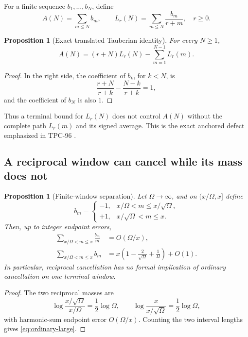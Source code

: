 \documentclass[11pt]{article}
\newtheorem{proposition}[theorem]{Proposition}
\theoremstyle{definition}
\theoremstyle{remark}
\begin{document}
For a finite sequence \(b_1,\ldots,b_N\), define
\[
 A(N)=\sum_{m\le N}b_m,\qquad
 L_r(N)=\sum_{m\le N}\frac{b_m}{r+m},
\quad r\ge0.
\]

\begin{proposition}[Exact translated Tauberian identity]
\label{prop:tauberian}
For every \(N\ge1\),
\begin{equation}
 \boxed{
 A(N)=(r+N)L_r(N)-\sum_{m=1}^{N-1}L_r(m).}
\label{eq:tauberian}
\end{equation}
\end{proposition}

\begin{proof}
In the right side, the coefficient of \(b_k\), for \(k<N\), is
\[
 \frac{r+N}{r+k}-\frac{N-k}{r+k}=1,
\]
and the coefficient of \(b_N\) is also \(1\).
\end{proof}

Thus a terminal bound for \(L_r(N)\) does not control \(A(N)\)
without the complete path \(L_r(m)\) and its signed average.  This
is the exact anchored defect emphasized in TPC-96
\citep{WangTPC96}.

\subsection{A reciprocal window can cancel while its mass does not}

\begin{proposition}[Finite-window separation]
\label{prop:window-separation}
Let \(\Omega\to\infty\), and on
\((x/\Omega,x]\) define
\[
 b_m=
 \begin{cases}
 -1,&x/\Omega<m\le x/\sqrt\Omega,\\
 +1,&x/\sqrt\Omega<m\le x.
 \end{cases}
\]
Then, up to integer endpoint errors,
\begin{align}
 \sum_{x/\Omega<m\le x}\frac{b_m}{m}
 &=O(\Omega/x),\label{eq:log-cancel}\\
 \sum_{x/\Omega<m\le x}b_m
 &=x\left(1-\frac2{\sqrt\Omega}+\frac1\Omega\right)+O(1).
\label{eq:ordinary-large}
\end{align}
In particular, reciprocal cancellation has no formal implication
of ordinary cancellation on one terminal window.
\end{proposition}

\begin{proof}
The two reciprocal masses are
\[
 \log\frac{x/\sqrt\Omega}{x/\Omega}
 =
 \frac12\log\Omega,
 \qquad
 \log\frac{x}{x/\sqrt\Omega}
 =
 \frac12\log\Omega,
\]
with harmonic-sum endpoint error \(O(\Omega/x)\).  Counting the two
interval lengths gives \eqref{eq:ordinary-large}.
\end{proof}
\end{document}
